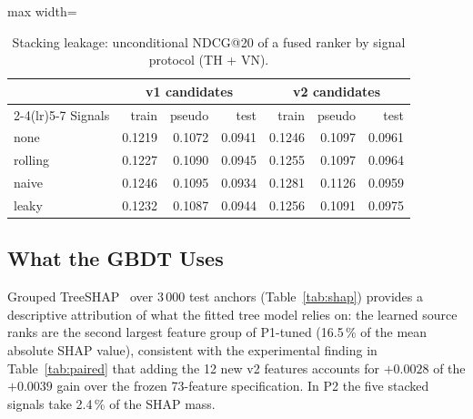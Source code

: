 \documentclass{ieeeaccess}
\begin{document}
\begin{table}[t]
\caption{Stacking leakage: unconditional NDCG@20 of a fused ranker by signal protocol (TH + VN).}
\label{tab:t29b}
\setlength{\tabcolsep}{3pt}
\centering
\begin{adjustbox}{max width=\columnwidth}
\begin{tabular}{lrrrrrr}
\toprule
 & \multicolumn{3}{c}{v1 candidates} & \multicolumn{3}{c}{v2 candidates} \\
\cmidrule(lr){2-4}\cmidrule(lr){5-7}
Signals & train & pseudo & test & train & pseudo & test \\
\midrule
none    & 0.1219 & 0.1072 & 0.0941 & 0.1246 & 0.1097 & 0.0961 \\
rolling & 0.1227 & 0.1090 & 0.0945 & 0.1255 & 0.1097 & 0.0964 \\
naive   & 0.1246 & 0.1095 & 0.0934 & 0.1281 & 0.1126 & 0.0959 \\
leaky   & 0.1232 & 0.1087 & 0.0944 & 0.1256 & 0.1091 & 0.0975 \\
\bottomrule
\end{tabular}
\end{adjustbox}
\end{table}

\subsection{What the GBDT Uses}
\label{sec:shap}
Grouped TreeSHAP~\cite{lundberg2020treeshap} over 3\,000 test anchors (Table~\ref{tab:shap}) provides a descriptive attribution of what the fitted tree model relies on: the learned source ranks are
the second largest feature group of P1-tuned (16.5\,\% of the mean absolute SHAP value), consistent with the experimental finding in Table~\ref{tab:paired} that adding the 12 new v2 features accounts for $+0.0028$ of the $+0.0039$ gain over the frozen 73-feature specification. In P2 the five stacked signals take 2.4\,\% of the SHAP mass.
\end{document}
